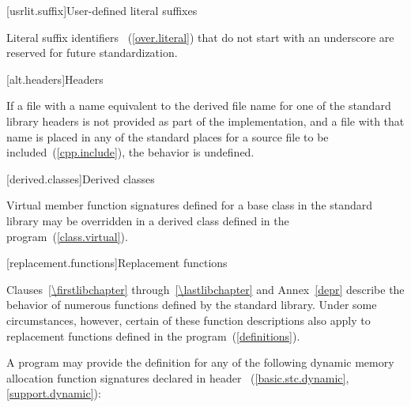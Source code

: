 [usrlit.suffix]{User-defined literal suffixes}

\pnum
Literal suffix identifiers ~(\ref{over.literal}) that do not start with an underscore are reserved for future standardization.

[alt.headers]{Headers}

\pnum
If a file with a name
equivalent to the derived file name for one of the \Cpp standard library headers
is not provided as part of the implementation, and a file with that name
is placed in any of the standard places for a source file to be included~(\ref{cpp.include}),
the behavior is undefined.%
%

[derived.classes]{Derived classes}

\pnum
Virtual member function signatures defined
%
for a base class in the \Cpp standard
%
%
library may be overridden in a derived class defined in the program~(\ref{class.virtual}).

[replacement.functions]{Replacement functions}

\pnum
{}%
Clauses~\ref{\firstlibchapter} through~\ref{\lastlibchapter} and Annex~\ref{depr}
describe the behavior of numerous functions defined by
the \Cpp standard library.
Under some circumstances,
%
however, certain of these function descriptions also apply to replacement functions defined
in the program~(\ref{definitions}).

\pnum
A \Cpp program may provide the definition for any of the following
dynamic memory allocation function signatures declared in header
~(\ref{basic.stc.dynamic}, \ref{support.dynamic}):

